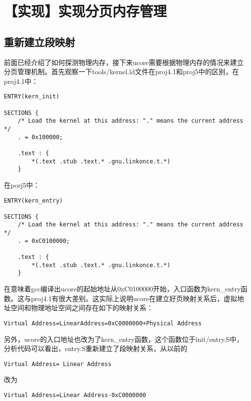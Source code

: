 \section{【实现】实现分页内存管理}\label{ux5b9eux73b0ux5b9eux73b0ux5206ux9875ux5185ux5b58ux7ba1ux7406}

\subsection{重新建立段映射}\label{ux91cdux65b0ux5efaux7acbux6bb5ux6620ux5c04}

前面已经介绍了如何探测物理内存，接下来ucore需要根据物理内存的情况来建立分页管理机制。首先观察一下tools/kernel.ld文件在proj4.1和proj5中的区别，在proj4.1中：

\begin{lstlisting}
ENTRY(kern_init)

SECTIONS {
    /* Load the kernel at this address: "." means the current address */
    . = 0x100000;

    .text : {
        *(.text .stub .text.* .gnu.linkonce.t.*)
    }
\end{lstlisting}

在porj5中：

\begin{lstlisting}
ENTRY(kern_entry)

SECTIONS {
    /* Load the kernel at this address: "." means the current address */
    . = 0xC0100000;

    .text : {
        *(.text .stub .text.* .gnu.linkonce.t.*)
    }
\end{lstlisting}

在意味着gcc编译出ucore的起始地址从0xC0100000开始，入口函数为kern\_entry函数。这与proj4.1有很大差别。这实际上说明ucore在建立好页映射关系后，虚拟地址空间和物理地址空间之间存在如下的映射关系：

\begin{lstlisting}
Virtual Address=LinearAddress=0xC0000000+Physical Address
\end{lstlisting}

另外，ucore的入口地址也改为了kern\_entry函数，这个函数位于init/entry.S中，分析代码可以看出，entry.S重新建立了段映射关系，从以前的

\begin{lstlisting}
Virtual Address= Linear Address
\end{lstlisting}

改为

\begin{lstlisting}
Virtual Address=Linear Address-0xC0000000
\end{lstlisting}

